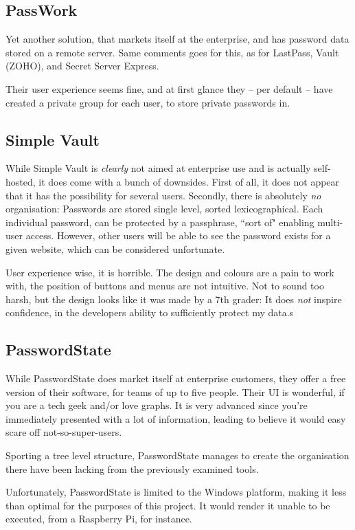 		\subsection{PassWork}
			Yet another solution, that markets itself at the enterprise, and has password data stored on a remote server. Same comments goes for this, as for LastPass, Vault (ZOHO), and Secret Server Express. 

			Their user experience seems fine, and at first glance they -- per default -- have created a private group for each user, to store private passwords in. 

		\subsection{Simple Vault}
			While Simple Vault is \emph{clearly} not aimed at enterprise use and is actually self-hosted, it does come with a bunch of downsides. First of all, it does not appear that it has the possibility for several users. Secondly, there is absolutely \emph{no} organisation: Passwords are stored single level, sorted lexicographical. Each individual password, can be protected by a passphrase, ``sort of" enabling multi-user access. However, other users will be able to see the password exists for a given website, which can be considered unfortunate.

			User experience wise, it is horrible. The design and colours are a pain to work with, the position of buttons and menus are not intuitive. Not to sound too harsh, but the design looks like it was made by a 7th grader: It does \emph{not} inspire confidence, in the developers ability to sufficiently protect my data.s

		\subsection{PasswordState}
			While PasswordState does market itself at enterprise customers, they offer a free version of their software, for teams of up to five people. Their UI is wonderful, if you are a tech geek and/or love graphs. It is very advanced since you're immediately presented with a lot of information, leading to believe it would easy scare off not-so-super-users.

			Sporting a tree level structure, PasswordState manages to create the organisation there have been lacking from the previously examined tools.

			Unfortunately, PasswordState is limited to the Windows platform, making it less than optimal for the purposes of this project. It would render it unable to be executed, from a Raspberry Pi, for instance.



